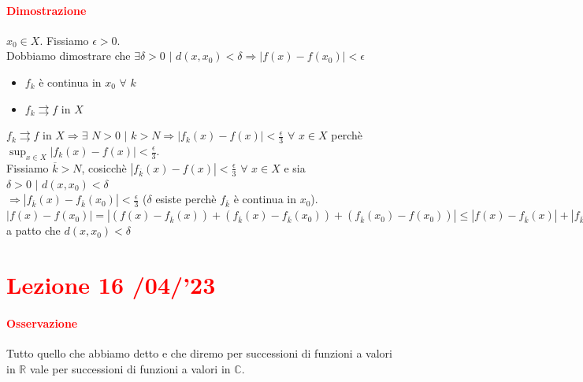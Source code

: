 \documentclass{article}
\newcommand{\R}{\mathbb{R}}
\newcommand{\C}{\mathbb{C}}
\begin{document}
\paragraph{\textcolor{red}{Dimostrazione}}
$x_0 \in X$. Fissiamo $\epsilon >0$.\\
Dobbiamo dimostrare che $\exists \delta >0\,\, |\,\, d(x,x_0) <\delta \Rightarrow |f(x)-f(x_0)|<\epsilon$
\begin{itemize}
    \item $f_k$ è continua in $x_0 \,\, \forall \,\, k$
    \item $f_k \rightrightarrows f$ in $X$
\end{itemize}
$f_k \rightrightarrows f$ in $X \Rightarrow \exists\,\, N >0 \,\,|\,\, k >N \Rightarrow |f_k (x)-f(x)|< \frac{\epsilon}{3} \,\, \forall \,\, x \in X$ perchè $\sup_{x\in X}|f_k(x)-f(x)|<\frac{\epsilon}{3}$.\\
Fissiamo $\overline{k}>N$, cosicchè $|f_{\overline{k}}(x) -f(x)|<\frac{\epsilon}{3} \,\,\forall \,\, x \in X$ e sia $\delta >0 \,\,|\,\, d(x,x_0) <\delta$\\$\Rightarrow |f_{\overline{k}}(x) -f_{\overline{k}}(x_0)| <\frac{\epsilon}{3}$ ($\delta$ esiste perchè $f_{\overline{k}}$ è continua in $x_0$).\\
$|f(x)-f(x_0)| =|(f(x)-f_{\overline{k}}(x))+(f_{\overline{k}}(x)-f_{\overline{k}}(x_0))+(f_{\overline{k}}(x_0)-f(x_0))|\leq |f(x)-f_{\overline{k}}(x)|+|f_{\overline{k}}(x)-f_{\overline{k}}(x_0)|+|f_{\overline{k}}(x_0)-f(x_0)| < \frac{\epsilon}{3}+\frac{\epsilon}{3}+\frac{\epsilon}{3}=\epsilon$ a patto che $d(x,x_0)< \delta$
\begin{flushright}
\large\Lightning
\end{flushright}

\newpage
\section{\textcolor{red}{Lezione 16 \space{}/04/'23}}
\paragraph{\textcolor{red}{Osservazione}}
Tutto quello che abbiamo detto e che diremo  per successioni di funzioni a valori in $\R$ vale per successioni di funzioni a valori in $\C$.
\end{document}
